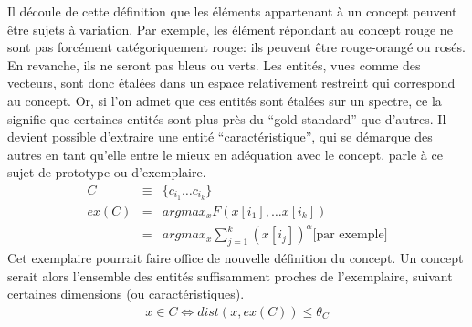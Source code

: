\documentclass[french]{article}
\begin{document}
				Il découle de cette définition que les éléments appartenant à un concept peuvent être sujets à variation. Par exemple, les élément répondant au concept rouge ne sont pas forcément catégoriquement rouge: ils peuvent être rouge-orangé ou rosés. En revanche, ils ne seront pas bleus ou verts. Les entités, vues comme des vecteurs, sont donc étalées dans un espace relativement restreint qui correspond au concept. Or, si l'on admet que ces entités sont étalées sur un spectre, ce la signifie que certaines entités sont plus près du ``gold standard'' que d'autres. Il devient possible d'extraire une entité ``caractéristique'', qui se démarque des autres en tant qu'elle entre le mieux en adéquation avec le concept. \cite{rosch1973} parle à ce sujet de prototype ou d'exemplaire. 
				\begin{eqnarray}
				C &\equiv&  \lbrace c_{i_1} \dots c_{i_k} \rbrace \\
				ex(C) &=& argmax_x F(x[i_1], \dots x[i_k]) \\
				&=& argmax_x \sum_{j = 1}^{k}(x[i_j])^\alpha \mbox{[par exemple]}
				\end{eqnarray}
				Cet exemplaire pourrait faire office de nouvelle définition du concept. Un concept serait alors l'ensemble des entités suffisamment proches de l'exemplaire, suivant certaines dimensions (ou caractéristiques).
				\begin{eqnarray}
				x \in C \iff dist(x, ex(C)) \leq \theta_C
				\end{eqnarray}
\end{document}
